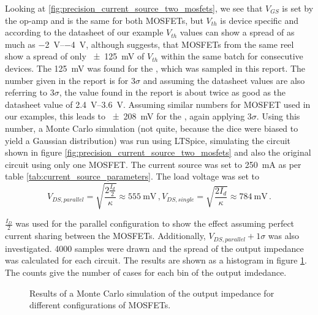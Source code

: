 Looking at \ref{fig:precision_current_source_two_mosfets}, we see that $V_{GS}$ is set by the op-amp and is the same for both MOSFETs, but $V_{th}$ is device specific and according to the datasheet of our example  \cite{datasheet_IRF9610} $V_{th}$ values can show a spread of as much as \qtyrange[range-units = single]{-2}{-4}{\V}, although \cite{appnote_mosfet_parameter_spread} suggests, that MOSFETs from the same reel show a spread of only \qty{\pm 125}{\mV} of $V_{th}$  within the same batch for consecutive devices. The \qty{125}{\mV} was found for the  \cite{datasheet_BUK7S1R5}, which was sampled in this report. The number given in the report is for $3\sigma$ and assuming the datasheet values are also referring to $3\sigma$, the value found in the report is about twice as good as the datasheet value of \qtyrange[range-units = single]{2.4}{3.6}{\V}. Assuming similar numbers for  MOSFET used in our examples, this leads to \qty{\pm 208}{\mV} for the , again applying $3\sigma$. Using this number, a Monte Carlo simulation (not quite, because the dice were biased to yield a Gaussian distribution) was run using LTSpice, simulating the circuit shown in figure \ref{fig:precision_current_source_two_mosfets} and also the original circuit using only one MOSFET. The current source was set to \qty{250}{\mA} as per table \ref{tab:current_source_parameters}. The load voltage was set to
\begin{equation}
    V_{DS, parallel} = \sqrt{\frac{2 \frac{I_d}{2}}{\kappa}} \approx \qty{555}{\mV}\,,
    V_{DS, single} = \sqrt{\frac{2 I_d}{\kappa}} \approx \qty{784}{\mV} \,. \nonumber
\end{equation}

$\frac{I_D}{2}$ was used for the parallel configuration to show the effect assuming perfect current sharing between the MOSFETs. Additionally, $V_{DS, parallel} + 1\sigma$ was also investigated. \num{4000} samples were drawn and the spread of the output impedance was calculated for each circuit. The results are shown as a histogram in figure \ref{fig:ltpsice_mosfet_mc_output_impedance}. The counts give the number of cases for each bin of the output imdedance.

\begin{figure}[ht]
    \centering
    
    \caption{Results of a Monte Carlo simulation of the output impedance for different configurations of MOSFETs.}
    \label{fig:ltpsice_mosfet_mc_output_impedance}
\end{figure}

